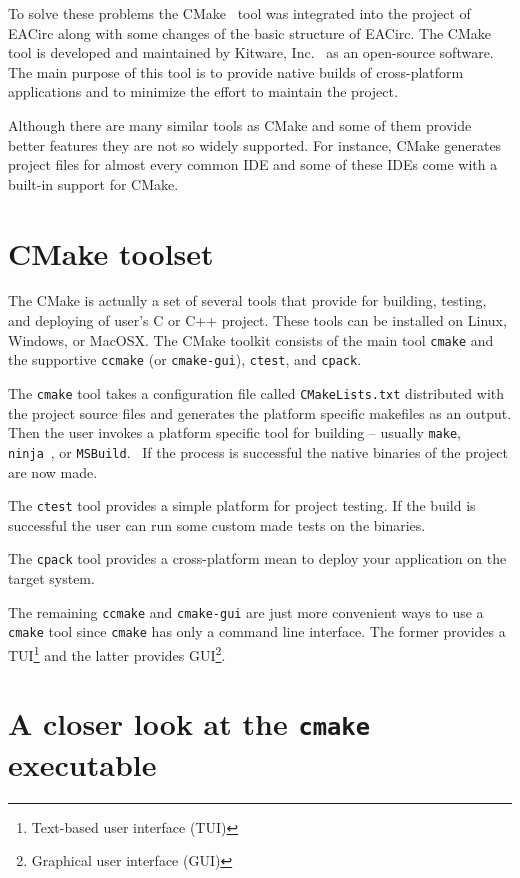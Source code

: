\documentclass[12pt,twoside]{fithesis2}
\begin{document}
To solve these problems the CMake~\cite{cmake} tool was integrated into the project of EACirc along with some changes of the basic structure of EACirc. The CMake tool is developed and maintained by Kitware, Inc.~\cite{kitware} as an open-source software. The main purpose of this tool is to provide native builds of cross-platform applications and to minimize the effort to maintain the project.

Although there are many similar tools as CMake and some of them provide better features they are not so widely supported. For instance, CMake generates project files for almost every common IDE and some of these IDEs come with a built-in support for CMake.

\section{CMake toolset}

The CMake is actually a set of several tools that provide for building, testing, and deploying of user's C or C++ project. These tools can be installed on Linux, Windows, or MacOSX. The CMake toolkit consists of the main tool \texttt{cmake} and the supportive \texttt{ccmake} (or \texttt{cmake-gui}), \texttt{ctest}, and \texttt{cpack}.~\cite{cmake_docs}

The \texttt{cmake} tool takes a configuration file called \texttt{CMakeLists.txt} distributed with the project source files and generates the platform specific makefiles as an output. Then the user invokes a platform specific tool for building -- usually \texttt{make}, \texttt{ninja}~\cite{ninja}, or \texttt{MSBuild}.~\cite{msbuild} If the process is successful the native binaries of the project are now made.

The \texttt{ctest} tool provides a simple platform for project testing. If the build is successful the user can run some custom made tests on the binaries.

The \texttt{cpack} tool provides a cross-platform mean to deploy your application on the target system.

The remaining \texttt{ccmake} and \texttt{cmake-gui} are just more convenient ways to use a \texttt{cmake} tool since \texttt{cmake} has only a command line interface. The former provides a TUI\footnote{Text-based user interface (TUI)} and the latter provides GUI\footnote{Graphical user interface (GUI)}.

\section{A closer look at the \texttt{cmake} executable}
\end{document}
